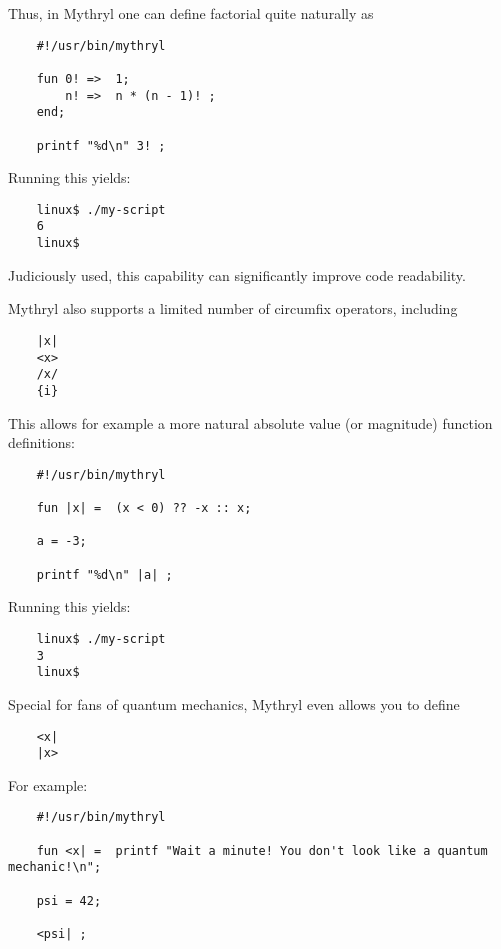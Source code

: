 Thus, in Mythryl one can define factorial quite naturally as

\begin{verbatim}
    #!/usr/bin/mythryl

    fun 0! =>  1;
        n! =>  n * (n - 1)! ;
    end;

    printf "%d\n" 3! ;
\end{verbatim}

Running this yields:

\begin{verbatim}
    linux$ ./my-script
    6
    linux$
\end{verbatim}

Judiciously used, this capability can significantly improve code readability.

Mythryl also supports a limited number of circumfix operators, including

\begin{verbatim}
    |x|
    <x>
    /x/
    {i}
\end{verbatim}

This allows for example a more natural absolute value (or magnitude) 
function definitions:

\begin{verbatim}
    #!/usr/bin/mythryl

    fun |x| =  (x < 0) ?? -x :: x;

    a = -3;

    printf "%d\n" |a| ;
\end{verbatim}

Running this yields:

\begin{verbatim}
    linux$ ./my-script
    3
    linux$
\end{verbatim}


Special for fans of quantum mechanics, Mythryl even allows you to define 

\begin{verbatim}
    <x|
    |x>
\end{verbatim}

For example:

\begin{verbatim}
    #!/usr/bin/mythryl

    fun <x| =  printf "Wait a minute! You don't look like a quantum mechanic!\n";

    psi = 42;

    <psi| ;
\end{verbatim}

